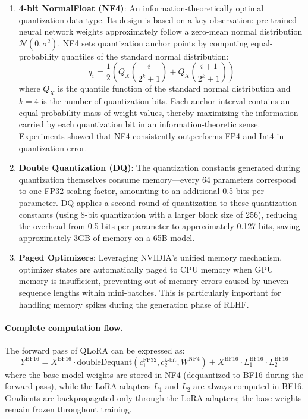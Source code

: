 \begin{enumerate}[leftmargin=2em]
  \item \textbf{4-bit NormalFloat (NF4)}:
    An information-theoretically optimal quantization data type.
    Its design is based on a key observation:
    pre-trained neural network weights approximately follow a zero-mean normal distribution $\mathcal{N}(0, \sigma^2)$.
    NF4 sets quantization anchor points by computing equal-probability quantiles of the standard normal distribution:
    \begin{equation}
    q_i = \frac{1}{2}\left(Q_X\!\left(\frac{i}{2^k+1}\right) + Q_X\!\left(\frac{i+1}{2^k+1}\right)\right)
    \end{equation}
    where $Q_X$ is the quantile function of the standard normal distribution and $k = 4$ is the number of quantization bits.
    Each anchor interval contains an equal probability mass of weight values,
    thereby maximizing the information carried by each quantization bit in an information-theoretic sense.
    Experiments showed that NF4 consistently outperforms FP4 and Int4 in quantization error.

  \item \textbf{Double Quantization (DQ)}:
    The quantization constants generated during quantization themselves consume memory---every 64 parameters correspond to one FP32 scaling factor, amounting to an additional 0.5 bits per parameter.
    DQ applies a second round of quantization to these quantization constants (using 8-bit quantization with a larger block size of 256),
    reducing the overhead from 0.5 bits per parameter to approximately 0.127 bits,
    saving approximately 3GB of memory on a 65B model.

  \item \textbf{Paged Optimizers}:
    Leveraging NVIDIA's unified memory mechanism,
    optimizer states are automatically paged to CPU memory when GPU memory is insufficient,
    preventing out-of-memory errors caused by uneven sequence lengths within mini-batches.
    This is particularly important for handling memory spikes during the generation phase of RLHF.
\end{enumerate}

\paragraph{Complete computation flow.}
The forward pass of QLoRA can be expressed as:
\begin{equation}
Y^{\text{BF16}} = X^{\text{BF16}} \cdot \text{doubleDequant}(c_1^{\text{FP32}}, c_2^{\text{k-bit}}, W^{\text{NF4}}) + X^{\text{BF16}} \cdot L_1^{\text{BF16}} \cdot L_2^{\text{BF16}}
\end{equation}
where the base model weights are stored in NF4 (dequantized to BF16 during the forward pass),
while the LoRA adapters $L_1$ and $L_2$ are always computed in BF16.
Gradients are backpropagated only through the LoRA adapters; the base weights remain frozen throughout training.

